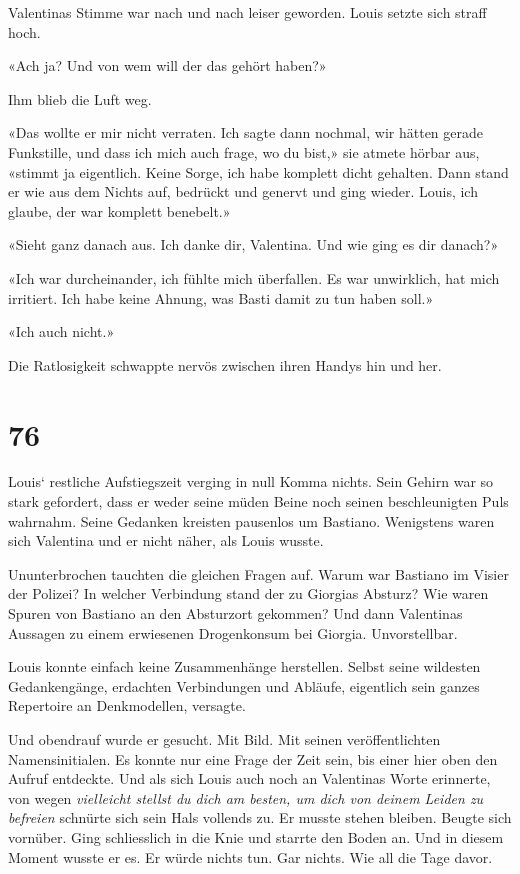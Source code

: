 Valentinas Stimme war nach und nach leiser geworden. Louis setzte sich
straff hoch.

«Ach ja? Und von wem will der das gehört haben?»

Ihm blieb die Luft weg.

«Das wollte er mir nicht verraten. Ich sagte dann nochmal, wir hätten
gerade Funkstille, und dass ich mich auch frage, wo du bist,» sie atmete
hörbar aus, «stimmt ja eigentlich. Keine Sorge, ich habe komplett dicht
gehalten. Dann stand er wie aus dem Nichts auf, bedrückt und genervt und
ging wieder. Louis, ich glaube, der war komplett benebelt.»

«Sieht ganz danach aus. Ich danke dir, Valentina. Und wie ging es dir
danach?»

«Ich war durcheinander, ich fühlte mich überfallen. Es war unwirklich,
hat mich irritiert. Ich habe keine Ahnung, was Basti damit zu tun haben
soll.»

«Ich auch nicht.»

Die Ratlosigkeit schwappte nervös zwischen ihren Handys hin und her.

\chapter{76}\label{section-76}

Louis` restliche Aufstiegszeit verging in null Komma nichts. Sein Gehirn
war so stark gefordert, dass er weder seine müden Beine noch seinen
beschleunigten Puls wahrnahm. Seine Gedanken kreisten pausenlos um
Bastiano. Wenigstens waren sich Valentina und er nicht näher, als Louis
wusste.

Ununterbrochen tauchten die gleichen Fragen auf. Warum war Bastiano im
Visier der Polizei? In welcher Verbindung stand der zu Giorgias Absturz?
Wie waren Spuren von Bastiano an den Absturzort gekommen? Und dann
Valentinas Aussagen zu einem erwiesenen Drogenkonsum bei Giorgia.
Unvorstellbar.

Louis konnte einfach keine Zusammenhänge herstellen. Selbst seine
wildesten Gedankengänge, erdachten Verbindungen und Abläufe, eigentlich
sein ganzes Repertoire an Denkmodellen, versagte.

Und obendrauf wurde er gesucht. Mit Bild. Mit seinen veröffentlichten
Namensinitialen. Es konnte nur eine Frage der Zeit sein, bis einer hier
oben den Aufruf entdeckte. Und als sich Louis auch noch an Valentinas
Worte erinnerte, von wegen \emph{vielleicht stellst du dich am besten,
um dich von deinem Leiden zu befreien} schnürte sich sein Hals vollends
zu. Er musste stehen bleiben. Beugte sich vornüber. Ging schliesslich in
die Knie und starrte den Boden an. Und in diesem Moment wusste er es. Er
würde nichts tun. Gar nichts. Wie all die Tage davor.

